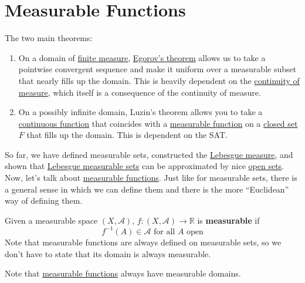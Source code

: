 \section{Measurable Functions}

  The two main theorems: 
  \begin{enumerate}
    \item On a domain of \hyperref[def:finite-measure]{finite measure}, \hyperref[thm:egorovs-theorem]{Egorov's theorem} allows us to take a pointwise convergent sequence and make it uniform over a measurable subset that nearly fills up the domain. This is heavily dependent on the \hyperref[thm:continuity-of-measure]{continuity of measure}, which itself is a consequence of the continuity of measure.
    \item On a possibly infinite domain, Luzin's theorem allows you to take a \hyperref[pst-def:continuous_func]{continuous function} that coincides with a \hyperref[def:measurable-function]{measurable function} on a \hyperref[pst-def:closed]{closed set} $F$ that fills up the domain. This is dependent on the SAT. 
  \end{enumerate}

  So far, we have defined measurable sets, constructed the \hyperref[def:lebesgue-measure]{Lebesgue measure}, and shown that \hyperref[def:lebesgue-measurable-set]{Lebesgue measurable sets} can be approximated by nice \hyperref[pst-def:open-set]{open sets}. Now, let's talk about \hyperref[def:measurable-function]{measurable functions}. Just like for measurable sets, there is a general sense in which we can define them and there is the more ``Euclidean'' way of defining them. 

  \begin{definition}
    \label{def:measurable-function}
    Given a measurable space $(X, \mathcal{A})$, $f: (X, \mathcal{A}) \to \mathbb{R}$ is \textbf{measurable} if 
    \begin{equation}
      f^{-1}(A) \in \mathcal{A} \text{ for all } A \text{ open}
    \end{equation}
    Note that measurable functions are always defined on measurable sets, so we don't have to state that its domain is always measurable. 
  \end{definition}

  Note that \hyperref[def:measurable-function]{measurable functions} always have measurable domains. 

